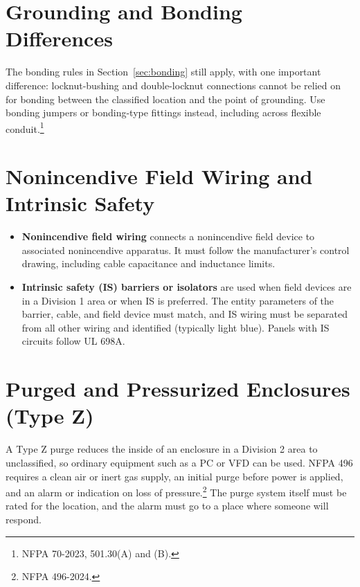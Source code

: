 \section{Grounding and Bonding Differences}
The bonding rules in Section~\ref{sec:bonding} still apply, with one important difference: locknut-bushing and double-locknut connections cannot be relied on for bonding between the classified location and the point of grounding. Use bonding jumpers or bonding-type fittings instead, including across flexible conduit.\footnote{NFPA 70-2023, 501.30(A) and (B).}

\section{Nonincendive Field Wiring and Intrinsic Safety}
\begin{itemize}[itemsep=1pt]
  \item \textbf{Nonincendive field wiring} connects a nonincendive field device to associated nonincendive apparatus. It must follow the manufacturer's control drawing, including cable capacitance and inductance limits.
  \item \textbf{Intrinsic safety (IS) barriers or isolators} are used when field devices are in a Division 1 area or when IS is preferred. The entity parameters of the barrier, cable, and field device must match, and IS wiring must be separated from all other wiring and identified (typically light blue). Panels with IS circuits follow UL 698A.
\end{itemize}

\section{Purged and Pressurized Enclosures (Type Z)}
A Type Z purge reduces the inside of an enclosure in a Division 2 area to unclassified, so ordinary equipment such as a PC or VFD can be used. NFPA 496 requires a clean air or inert gas supply, an initial purge before power is applied, and an alarm or indication on loss of pressure.\footnote{NFPA 496-2024.} The purge system itself must be rated for the location, and the alarm must go to a place where someone will respond.

